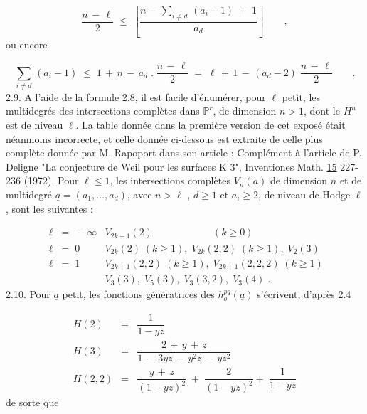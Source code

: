 \begin{equation*}
\frac{n \, - \, \ell}{2} \;\leq\; \left[ \frac{n - \, \sum_{i \neq d} \, (a_i - 1) \; + \; 1}{a_d} \right] \qquad ,
\end{equation*}
ou encore

\begin{equation*}
\sum_{i \neq d} \, (a_i - 1) \;\leq\; 1 \, + \, n \, - \, a_d \; . \; \frac{n \, - \, \ell}{2} \;=\; \ell \, + \, 1 \, - \, (a_d - 2) \; \frac{n \, - \, \ell}{2} \qquad .
\end{equation*}
2.9. \quad A l'aide de la formule 2.8, il est facile d'énumérer, pour $\ell$ petit, les multidegrés des intersections complètes dans $\mathbb{P}^r$, de dimension $n > 1$, dont le $H^n$ est de niveau $\ell$. La table donnée dans la première version de cet exposé était néanmoins incorrecte, et celle donnée ci-dessous est extraite de celle plus complète donnée par M. Rapoport dans son article : Complément à l'article de P. Deligne "La conjecture de Weil pour les surfaces K 3", Inventiones Math. \underline{15} 227-236 (1972). Pour $\ell \leq 1$, les intersections complètes $V_n(\underline{a})$ de dimension $n$ et de multidegré $\underline{a} = (a_1,\ldots,a_d)$, avec $n > \ell$ , $d \geq 1$ et $a_i \geq 2$, de niveau de Hodge $\ell$ , sont les suivantes :



\begin{equation*}
\begin{array}{ll}
\ell \;=\; -\infty & V_{2k+1}(2) \qquad\qquad\qquad (k \geq 0) \\[2ex]
\ell \;=\; 0 & V_{2k}(2) \; (k \geq 1), \; V_{2k}(2,2) \; (k \geq 1), \; V_2(3) \\[2ex]
\ell \;=\; 1 & V_{2k+1}(2,2) \; (k \geq 1), \; V_{2k+1}(2,2,2) \; (k \geq 1) \\
& V_3(3), \; V_5(3), \; V_3(3,2), \; V_3(4) \; .
\end{array}
\end{equation*}
2.10. \quad Pour $\underline{a}$ petit, les fonctions génératrices des $h_o^{pq}(\underline{a})$ s'écrivent, d'après 2.4

\begin{equation*}
\begin{array}{rcl}
H(2) & = & \dfrac{1}{1-yz} \\[3ex]
H(3) & = & \dfrac{2 \, + \, y \, + \, z}{1 \, - \, 3yz \, - \, y^2 z \, - \, yz^2} \\[3ex]
H(2,2) & = & \dfrac{y \, + \, z}{(1-yz)^2} \; + \; \dfrac{2}{(1-yz)^2} + \; \dfrac{1}{1-yz}
\end{array}
\end{equation*}
de sorte que

